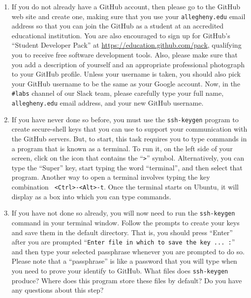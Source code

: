 \documentclass[11pt]{article}
\begin{document}
\begin{enumerate}

  \item If you do not already have a GitHub account, then please go to the GitHub web site and create one, making sure
    that you use your {\tt allegheny.edu} email address so that you can join the GitHub as a student at an accredited
    educational institution. You are also encouraged to sign up for GitHub's ``Student Developer Pack'' at
    \url{https://education.github.com/pack}, qualifying you to receive free software development tools. Also, please
    make sure that you add a description of yourself and an appropriate professional photograph to your GitHub profile.
    Unless your username is taken, you should also pick your GitHub username to be the same as your Google account. Now,
    in the {\tt \#labs} channel of our Slack team, please carefully type your full name, {\tt allegheny.edu} email
    address, and your new GitHub username.

  \item If you have never done so before, you must use the {\tt ssh-keygen} program to create secure-shell keys that you
    can use to support your communication with the GitHub servers. But, to start, this task requires you to type
    commands in a program that is known as a terminal. To run it, on the left side of your screen, click on the icon
    that contains the ``{\tt >}'' symbol. Alternatively, you can type the ``Super'' key, start typing the word
    ``terminal'', and then select that program. Another way to open a terminal involves typing the key combination {\tt
    <Ctrl>-<Alt>-t}. Once the terminal starts on Ubuntu, it will display as a box into which you can type commands.

  \item If you have not done so already, you will now need to run the {\tt ssh-keygen} command in your terminal window.
    Follow the prompts to create your keys and save them in the default directory. That is, you should press ``Enter''
    after you are prompted ``{\tt Enter file in which to save the key ...  :}'' and then type your selected passphrase
    whenever you are prompted to do so. Please note that a ``passphrase'' is like a password that you will type when you
    need to prove your identify to GitHub. What files does {\tt ssh-keygen} produce? Where does this program store these
    files by default? Do you have any questions about this step?


\end{enumerate}
\end{document}
